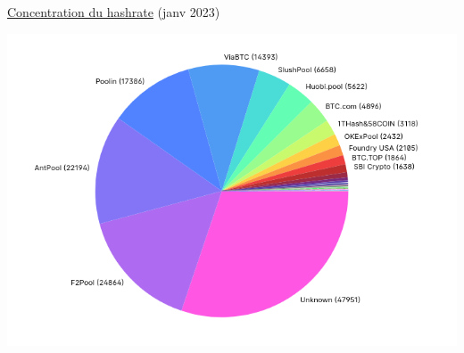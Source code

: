 \documentclass[presentation]{beamer}
\begin{document}
\begin{frame}[label={sec:orgc5711b1}]{\href{https://www.blockchain.com/charts/pools}{Concentration du hashrate} (janv 2023)}
\begin{center}
\includegraphics[width=.6\textwidth]{Pictures/hashrate_distrib_jan23.png}
\end{center}
\end{frame}
\end{document}
